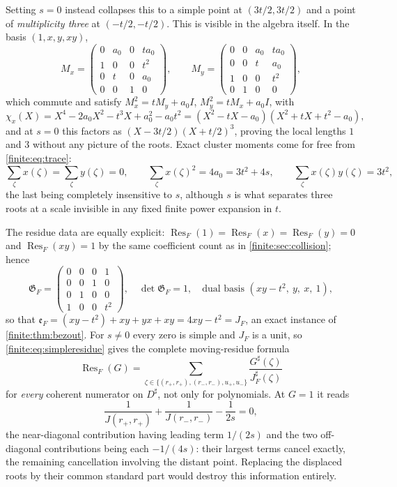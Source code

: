 \documentclass[11pt,letterpaper]{article}
\theoremstyle{definition}
\theoremstyle{remark}
\newcommand{\sh}{^{\sharp}}
\newcommand{\Gram}{\mathfrak G}
\newcommand{\Eul}{\mathfrak e}
\DeclareMathOperator{\Res}{Res}
\numberwithin{equation}{section}
\begin{document}
Setting $s=0$ instead collapses this to a simple point at $(3t/2,3t/2)$ and a point of \emph{multiplicity three} at $(-t/2,-t/2)$. This is visible in the algebra itself. In the basis $(1,x,y,xy)$,
\begin{equation}\label{finite:eq:triplematrices}
 M_x=\begin{pmatrix}0&a_0&0&ta_0\\1&0&0&t^2\\0&t&0&a_0\\0&0&1&0\end{pmatrix},
 \qquad
 M_y=\begin{pmatrix}0&0&a_0&ta_0\\0&0&t&a_0\\1&0&0&t^2\\0&1&0&0\end{pmatrix},
\end{equation}
which commute and satisfy $M_x^2=tM_y+a_0I$, $M_y^2=tM_x+a_0I$, with
\begin{equation}\label{finite:eq:triplechar}
 \chi_x(X)=X^4-2a_0X^2-t^3X+a_0^2-a_0t^2
 =(X^2-tX-a_0)(X^2+tX+t^2-a_0),
\end{equation}
and at $s=0$ this factors as $(X-3t/2)(X+t/2)^3$, proving the local lengths $1$ and $3$ without any picture of the roots. Exact cluster moments come for free from \eqref{finite:eq:trace}:
\[
 \sum_\zeta x(\zeta)=\sum_\zeta y(\zeta)=0,
 \qquad
 \sum_\zeta x(\zeta)^2=4a_0=3t^2+4s,
 \qquad
 \sum_\zeta x(\zeta)y(\zeta)=3t^2 ,
\]
the last being completely insensitive to $s$, although $s$ is what separates three roots at a scale invisible in any fixed finite power expansion in $t$.

The residue data are equally explicit: $\Res_F(1)=\Res_F(x)=\Res_F(y)=0$ and $\Res_F(xy)=1$ by the same coefficient count as in \cref{finite:sec:collision}; hence
\[
 \Gram_F=\begin{pmatrix}0&0&0&1\\0&0&1&0\\0&1&0&0\\1&0&0&t^2\end{pmatrix},
 \quad\det\Gram_F=1,
 \quad
 \text{dual basis }(xy-t^2,\ y,\ x,\ 1),
\]
so that $\Eul_F=(xy-t^2)+xy+yx+xy=4xy-t^2=J_F$, an exact instance of \cref{finite:thm:bezout}. For $s\neq0$ every zero is simple and $J_F$ is a unit, so \eqref{finite:eq:simpleresidue} gives the complete moving-residue formula
\begin{equation}\label{finite:eq:triplemoving}
 \Res_F(G)=\sum_{\zeta\in\{(r_+,r_+),(r_-,r_-),u_+,u_-\}}\frac{G\sh(\zeta)}{J_F\sh(\zeta)}
\end{equation}
for \emph{every} coherent numerator on $D\sh$, not only for polynomials. At $G=1$ it reads
\begin{equation}\label{finite:eq:triplecancel}
 \frac1{J(r_+,r_+)}+\frac1{J(r_-,r_-)}-\frac1{2s}=0,
\end{equation}
the near-diagonal contribution having leading term $1/(2s)$ and the two off-diagonal contributions being each $-1/(4s)$: their largest terms cancel exactly, the remaining cancellation involving the distant point. Replacing the displaced roots by their common standard part would destroy this information entirely.
\end{document}
